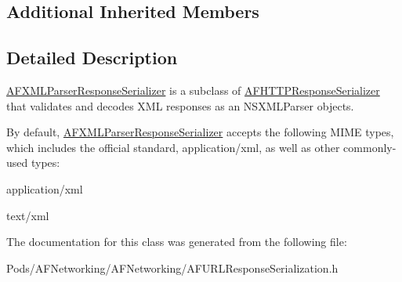 \subsection*{Additional Inherited Members}


\subsection{Detailed Description}
{\ttfamily \mbox{\hyperlink{interface_a_f_x_m_l_parser_response_serializer}{A\+F\+X\+M\+L\+Parser\+Response\+Serializer}}} is a subclass of {\ttfamily \mbox{\hyperlink{interface_a_f_h_t_t_p_response_serializer}{A\+F\+H\+T\+T\+P\+Response\+Serializer}}} that validates and decodes X\+ML responses as an {\ttfamily N\+S\+X\+M\+L\+Parser} objects.

By default, {\ttfamily \mbox{\hyperlink{interface_a_f_x_m_l_parser_response_serializer}{A\+F\+X\+M\+L\+Parser\+Response\+Serializer}}} accepts the following M\+I\+ME types, which includes the official standard, {\ttfamily application/xml}, as well as other commonly-\/used types\+:


\begin{DoxyItemize}
\item {\ttfamily application/xml}
\item {\ttfamily text/xml} 
\end{DoxyItemize}

The documentation for this class was generated from the following file\+:\begin{DoxyCompactItemize}
\item 
Pods/\+A\+F\+Networking/\+A\+F\+Networking/A\+F\+U\+R\+L\+Response\+Serialization.\+h\end{DoxyCompactItemize}

